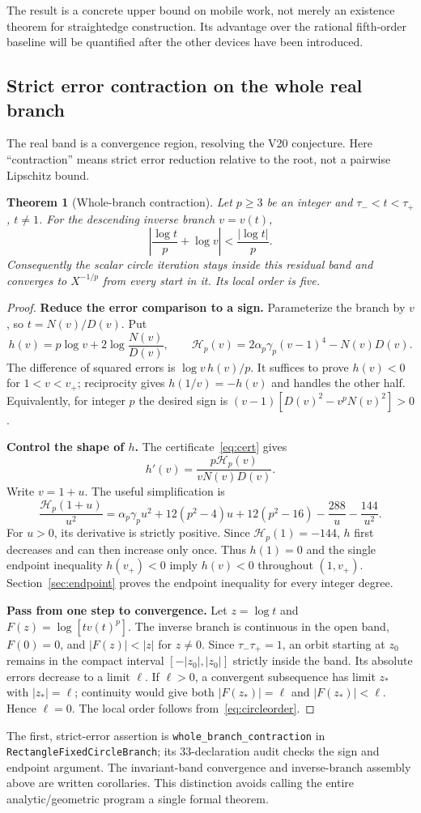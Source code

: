 \documentclass[11pt,a4paper]{article}
\newtheorem{theorem}{Theorem}[section]\newtheorem{proposition}[theorem]{Proposition}
\begin{document}
The result is a concrete upper bound on mobile work, not merely an existence theorem for straightedge construction. Its advantage over the rational fifth-order baseline will be quantified after the other devices have been introduced.

\clearpage
\subsection{Strict error contraction on the whole real branch}\label{sec:branch}
The real band is a convergence region, resolving the V20 conjecture. Here ``contraction'' means strict error reduction relative to the root, not a pairwise Lipschitz bound.

\begin{theorem}[Whole-branch contraction]\label{thm:branch}
Let $p\ge3$ be an integer and $\tau_-<t<\tau_+$, $t\ne1$. For the descending inverse branch $v=v(t)$,
\[
 \left|\frac{\log t}{p}+\log v\right|<\frac{|\log t|}{p}.
\]
Consequently the scalar circle iteration stays inside this residual band and converges to $X^{-1/p}$ from every start in it. Its local order is five.
\end{theorem}
\begin{proof}
\textbf{Reduce the error comparison to a sign.} Parameterize the branch by $v$, so $t=N(v)/D(v)$. Put
\[
 h(v)=p\log v+2\log\frac{N(v)}{D(v)},\qquad
 \mathcal H_p(v)=2\alpha_p\gamma_p(v-1)^4-N(v)D(v).
\]
The difference of squared errors is $\log v\,h(v)/p$. It suffices to prove $h(v)<0$ for $1<v<v_+$; reciprocity gives $h(1/v)=-h(v)$ and handles the other half. Equivalently, for integer $p$ the desired sign is $(v-1)[D(v)^2-v^pN(v)^2]>0$.

\textbf{Control the shape of $h$.} The certificate~\eqref{eq:cert} gives
\[
 h'(v)=\frac{p\mathcal H_p(v)}{vN(v)D(v)}.
\]
Write $v=1+u$. The useful simplification is
\[
 \frac{\mathcal H_p(1+u)}{u^2}=\alpha_p\gamma_pu^2+12(p^2-4)u+12(p^2-16)-\frac{288}{u}-\frac{144}{u^2}.
\]
For $u>0$, its derivative is strictly positive. Since $\mathcal H_p(1)=-144$, $h$ first decreases and can then increase only once. Thus $h(1)=0$ and the single endpoint inequality $h(v_+)<0$ imply $h(v)<0$ throughout $(1,v_+)$. Section~\ref{sec:endpoint} proves the endpoint inequality for every integer degree.

\textbf{Pass from one step to convergence.} Let $z=\log t$ and $F(z)=\log[tv(t)^p]$. The inverse branch is continuous in the open band, $F(0)=0$, and $|F(z)|<|z|$ for $z\ne0$. Since $\tau_-\tau_+=1$, an orbit starting at $z_0$ remains in the compact interval $[-|z_0|,|z_0|]$ strictly inside the band. Its absolute errors decrease to a limit $\ell$. If $\ell>0$, a convergent subsequence has limit $z_*$ with $|z_*|=\ell$; continuity would give both $|F(z_*)|=\ell$ and $|F(z_*)|<\ell$. Hence $\ell=0$. The local order follows from~\eqref{eq:circleorder}.
\end{proof}
The first, strict-error assertion is \texttt{whole\_branch\_contraction} in \texttt{RectangleFixedCircleBranch}; its 33-declaration audit checks the sign and endpoint argument. The invariant-band convergence and inverse-branch assembly above are written corollaries. This distinction avoids calling the entire analytic/geometric program a single formal theorem.
\end{document}
